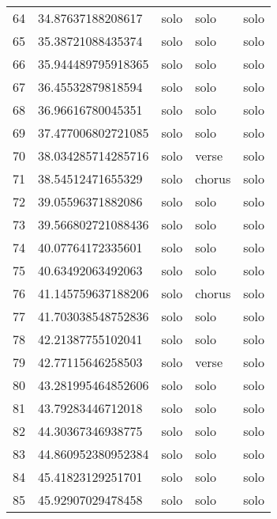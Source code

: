 \begin{table}[]
\begin{tabular}{lllll}
    64   & 34.87637188208617  & solo         & solo            & solo           \\
    65   & 35.38721088435374  & solo         & solo            & solo           \\
    66   & 35.944489795918365 & solo         & solo            & solo           \\
    67   & 36.45532879818594  & solo         & solo            & solo           \\
    68   & 36.96616780045351  & solo         & solo            & solo           \\
    69   & 37.477006802721085 & solo         & solo            & solo           \\
    70   & 38.034285714285716 & solo         & verse           & solo           \\
    71   & 38.54512471655329  & solo         & chorus          & solo           \\
    72   & 39.05596371882086  & solo         & solo            & solo           \\
    73   & 39.566802721088436 & solo         & solo            & solo           \\
    74   & 40.07764172335601  & solo         & solo            & solo           \\
    75   & 40.63492063492063  & solo         & solo            & solo           \\
    76   & 41.145759637188206 & solo         & chorus          & solo           \\
    77   & 41.703038548752836 & solo         & solo            & solo           \\
    78   & 42.21387755102041  & solo         & solo            & solo           \\
    79   & 42.77115646258503  & solo         & verse           & solo           \\
    80   & 43.281995464852606 & solo         & solo            & solo           \\
    81   & 43.79283446712018  & solo         & solo            & solo           \\
    82   & 44.30367346938775  & solo         & solo            & solo           \\
    83   & 44.860952380952384 & solo         & solo            & solo           \\
    84   & 45.41823129251701  & solo         & solo            & solo           \\
    85   & 45.92907029478458  & solo         & solo            & solo           \\

\end{tabular}
\end{table}
